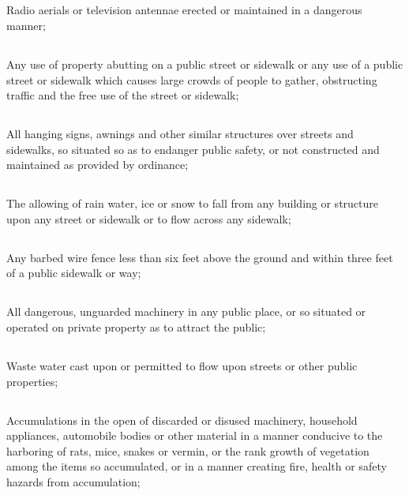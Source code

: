 \subsection{}
 Radio aerials or television antennae erected or maintained in a dangerous manner;
\subsection{}
 Any use of property abutting on a public street or sidewalk or any use of a public street or sidewalk which causes large crowds of people to gather, obstructing traffic and the free use of the street or sidewalk;
\subsection{}
 All hanging signs, awnings and other similar structures over streets and sidewalks, so situated so as to endanger public safety, or not constructed and maintained as provided by ordinance;
\subsection{}
 The allowing of rain water, ice or snow to fall from any building or structure upon any street or sidewalk or to flow across any sidewalk;
\subsection{}
 Any barbed wire fence less than six feet above the ground and within three feet of a public sidewalk or way;
\subsection{}
 All dangerous, unguarded machinery in any public place, or so situated or operated on private property as to attract the public;
\subsection{}
 Waste water cast upon or permitted to flow upon streets or other public properties;
\subsection{}
 Accumulations in the open of discarded or disused machinery, household appliances, automobile bodies or other material in a manner conducive to the harboring of rats, mice, snakes or vermin, or the rank growth of vegetation among the items so accumulated, or in a manner creating fire, health or safety hazards from accumulation;
